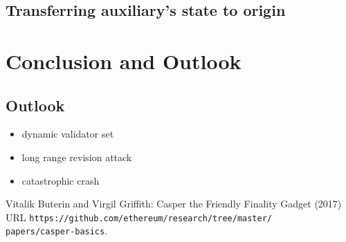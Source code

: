 \documentclass[12pt,a4paper,draft]{article}
\begin{document}
\subsection{Transferring auxiliary's state to origin}

\section{Conclusion and Outlook}

\subsection{Outlook}

\begin{itemize}
	\item dynamic validator set
	\item long range revision attack
	\item catastrophic crash
\end{itemize}

\begin{thebibliography}{9}

  Vitalik Buterin and Virgil Griffith:
  Casper the Friendly Finality Gadget (2017)\\
  URL \texttt{https://github.com/ethereum/research/tree/master/\\papers/casper-basics}.

\end{thebibliography}
\end{document}

